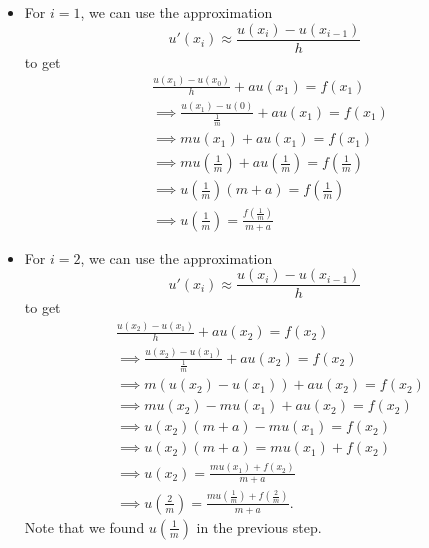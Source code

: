 \documentclass[letterpaper]{article}
\begin{document}
\begin{enumerate}
\begin{itemize}
        \item For $i = 1$, we can use the approximation 
        \[u'(x_i) \approx \frac{u(x_i) - u(x_{i - 1})}{h}\]
        to get 
        \begin{equation*}
            \begin{aligned}
                &\frac{u(x_1) - u(x_0)}{h} + au(x_1) = f(x_1) \\ 
                    &\implies \frac{u(x_1) - u(0)}{\frac{1}{m}} + au(x_1) = f(x_1) \\ 
                    &\implies mu(x_1) + au(x_1) = f(x_1) \\ 
                    &\implies mu\left(\frac{1}{m}\right) + au\left(\frac{1}{m}\right) = f\left(\frac{1}{m}\right) \\ 
                    &\implies u\left(\frac{1}{m}\right) (m + a) = f\left(\frac{1}{m}\right) \\ 
                    &\implies u\left(\frac{1}{m}\right) = \frac{f\left(\frac{1}{m}\right)}{m + a}
            \end{aligned}
        \end{equation*}

        \item For $i = 2$, we can use the approximation
        \[u'(x_i) \approx \frac{u(x_i) - u(x_{i - 1})}{h}\]
        to get 
        \begin{equation*}
            \begin{aligned}
                &\frac{u(x_2) - u(x_1)}{h} + au(x_2) = f(x_2) \\ 
                    &\implies \frac{u(x_2) - u(x_1)}{\frac{1}{m}} + au(x_2) = f(x_2) \\ 
                    &\implies m\left(u(x_2) - u(x_1)\right) + au(x_2) = f(x_2) \\ 
                    &\implies mu(x_2) - mu(x_1) + au(x_2) = f(x_2) \\ 
                    &\implies u(x_2)(m + a) - mu(x_1) = f(x_2) \\ 
                    &\implies u(x_2)(m + a) = mu(x_1) + f(x_2) \\ 
                    &\implies u(x_2) = \frac{mu(x_1) + f(x_2)}{m + a} \\ 
                    &\implies u\left(\frac{2}{m}\right) = \frac{mu\left(\frac{1}{m}\right) + f\left(\frac{2}{m}\right)}{m + a}.
            \end{aligned}
        \end{equation*}
        Note that we found $u\left(\frac{1}{m}\right)$ in the previous step.


\end{itemize}
\end{enumerate}
\end{document}
